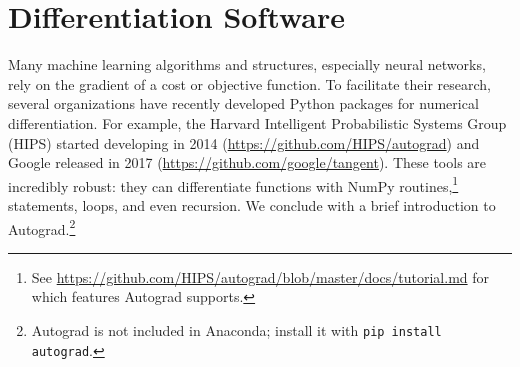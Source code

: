 \begin{comment} %
\begin{problem}
Find the error between your Jacobian function and the analytically computed derivative on the square $[-1,1] \times [-1,1]$ using ten thousand grid points (100 per side).
You may apply your Jacobian function to the points one at a time using a double \li{for} loop.  Once you get the error matrix for a given point, calculate the Frobenius norm of this matrix (\li{la.norm()} defaults to the Frobenius norm).  This norm will be your total error for that point.
Return the maximum error of your Jacobian function over all points in the square.

Hint: The following code defines the function
$f(x,y) = \left[\begin{array}{c} x^2 \\ x+y \end{array}\right]$.

\begin{lstlisting}
# f accepts a length-2 NumPy array
>>> f = lambda x: np.array([x[0]**2, x[0]+x[1]])
\end{lstlisting}
\end{problem}
\end{comment}


\section*{Differentiation Software} %

Many machine learning algorithms and structures, especially neural networks, rely on the gradient of a cost or objective function.
To facilitate their research, several organizations have recently developed Python packages for numerical differentiation.
For example, the Harvard Intelligent Probabilistic Systems Group (HIPS) started developing  in 2014 (\url{https://github.com/HIPS/autograd}) and Google released  in 2017 (\url{https://github.com/google/tangent}).
These tools are incredibly robust: they can differentiate functions with NumPy routines,\footnote{See \url{https://github.com/HIPS/autograd/blob/master/docs/tutorial.md} for which features Autograd supports.}  statements,  loops, and even recursion.
We conclude with a brief introduction to Autograd.\footnote{Autograd is not included in Anaconda; install it with \texttt{pip install autograd}.}


